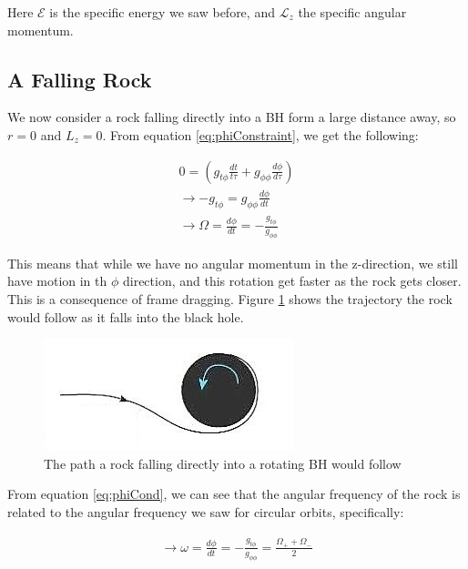 \documentclass[11pt,table]{article}
\begin{document}
Here $\mathcal{E}$ is the specific energy we saw before, and $\mathcal{L}_z$ the specific angular momentum. 

\subsection{A Falling Rock}

We now consider a rock falling directly into a BH form a large distance away, so $r = 0$ and $L_z = 0$. From equation \ref{eq:phiConstraint}, we get the following:

\begin{equation}
    \begin{aligned}
    0 = (g_{t\phi}\frac{dt}{t\tau}+g_{\phi\phi}\frac{d\phi}{d\tau})\\
    \rightarrow -g_{t\phi} = g_{\phi\phi}\frac{d\phi}{dt} \\
    \rightarrow \Omega = \frac{d\phi}{dt} = -\frac{g_{t\phi}}{g_{\phi\phi}}
    \label{eq:phiCond}
    \end{aligned}
\end{equation}

This means that while we have no angular momentum in the z-direction, we still have motion in th $\phi$ direction, and this rotation get faster as the rock gets closer. This is a consequence of frame dragging. Figure \ref{fig:fallingRock} shows the trajectory the rock would follow as it falls into the black hole.\\

\begin{figure}[H]
    \centering
    \includegraphics{Figures/kerrRadialPath.jpg}
    \caption{The path a rock falling directly into a rotating BH would follow}
    \label{fig:fallingRock}
\end{figure}

From equation \ref{eq:phiCond}, we can see that the angular frequency of the rock is related to the angular frequency we saw for circular orbits, specifically: 

\begin{equation}
    \begin{aligned}
    \rightarrow \omega = \frac{d\phi}{dt} = -\frac{g_{t\phi}}{g_{\phi\phi}} = \frac{\Omega_+ + \Omega_-}{2}
    \label{eq:angRock}
    \end{aligned}
\end{equation}
\end{document}

